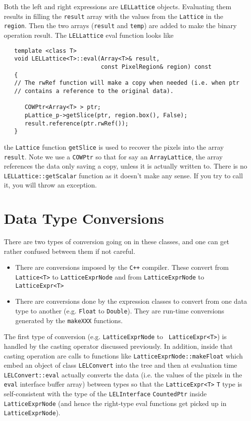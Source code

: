 Both the left and right expressions are {\tt LELLattice} objects.  Evaluating
them results in filling the {\tt result} array with the values from the
{\tt Lattice} in the {\tt region}.  Then the two arrays ({\tt result} and {\tt temp}) are
added to make the binary operation result.  The {\tt LELLattice} eval function
looks like


\begin{verbatim}
   template <class T>
   void LELLattice<T>::eval(Array<T>& result,
                            const PixelRegion& region) const
   {
   // The rwRef function will make a copy when needed (i.e. when ptr
   // contains a reference to the original data).
    
      COWPtr<Array<T> > ptr;
      pLattice_p->getSlice(ptr, region.box(), False);
      result.reference(ptr.rwRef());
   }
\end{verbatim}
 
the {\tt Lattice} function {\tt getSlice} is used to recover the pixels
into the array {\tt result}.  Note we use a {\tt COWPtr} so that for say
an {\tt ArrayLattice}, the array references the data only saving a copy,
unless it is actually written to.  There is no {\tt
LELLattice::getScalar} function as it doesn't make any sense.  If you
try to call it, you will throw an exception. 



\section {Data Type Conversions}

There are two types of conversion going on in these classes, and one can
get rather confused between them if not careful.  

\begin{itemize}
\item There are conversions imposed by the {\tt C++} compiler. These convert
     from {\tt Lattice<T>} to {\tt LatticeExprNode}
     and from {\tt LatticeExprNode} to {\tt LatticeExpr<T>}
\item There are conversions done by the expression classes to convert from one
   data type to another (e.g. {\tt Float} to {\tt Double}).
   They are run-time conversions generated by the {\tt makeXXX} functions.
\end{itemize}
  
The first type of conversion (e.g.  {\tt LatticeExprNode} to {\tt
LatticeExpr<T>}) is handled by the casting operator discussed
previously.  In addition, inside that casting operation are calls to
functions like {\tt LatticeExprNode::makeFloat} which embed an object of
class {\tt LELConvert} into the tree and then at evaluation time {\tt
LELConvert::eval} actually converts the data (i.e.  the values of the
pixels in the {\tt eval} interface buffer array) between types so that
the {\tt LatticeExpr<T>} {\tt T} type is self-consistent with the
type of the {\tt LELInterface} {\tt CountedPtr} inside {\tt
LatticeExprNode} (and hence the right-type eval functions get picked up
in {\tt LatticeExprNode}). 

